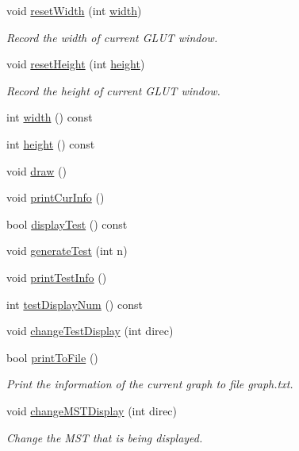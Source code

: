 \begin{DoxyCompactItemize}
void \hyperlink{classcmst_1_1_window_a3f234daf3198e3611892515f1721de44}{resetWidth} (int \hyperlink{classcmst_1_1_window_a5fc4ccbd9afed56cd17d341269028da2}{width})
\begin{DoxyCompactList}\small\item\em Record the width of current GLUT window. \end{DoxyCompactList}\item 
void \hyperlink{classcmst_1_1_window_a8c4d7788d1932e73397c20b7a9639d69}{resetHeight} (int \hyperlink{classcmst_1_1_window_a6fc02b2afee52c0f71b6a3bd39c9210f}{height})
\begin{DoxyCompactList}\small\item\em Record the height of current GLUT window. \end{DoxyCompactList}\item 
int \hyperlink{classcmst_1_1_window_a5fc4ccbd9afed56cd17d341269028da2}{width} () const 
\item 
int \hyperlink{classcmst_1_1_window_a6fc02b2afee52c0f71b6a3bd39c9210f}{height} () const 
\item 
void \hyperlink{classcmst_1_1_window_a1d78ef796691e87ed3b4978f373c9890}{draw} ()
\item 
void \hyperlink{classcmst_1_1_window_a73eb23d7d7418cb288022e623e590461}{printCurInfo} ()
\item 
bool \hyperlink{classcmst_1_1_window_aa3f5edeebdd298190bdb4676b4838f75}{displayTest} () const 
\item 
void \hyperlink{classcmst_1_1_window_acda99115d9c67f83de4d8f5a94f2647c}{generateTest} (int n)
\item 
void \hyperlink{classcmst_1_1_window_a471e1648f99754f7c2cbfbbb1e8ab556}{printTestInfo} ()
\item 
int \hyperlink{classcmst_1_1_window_ae456c1bf45fc28133390fcc881fbd612}{testDisplayNum} () const 
\item 
void \hyperlink{classcmst_1_1_window_aa8dc3725888e12fc2c6e3626ab7b600a}{changeTestDisplay} (int direc)
\item 
bool \hyperlink{classcmst_1_1_window_a1d2514395cd8e864ddcd6aadf127bbbc}{printToFile} ()
\begin{DoxyCompactList}\small\item\em Print the information of the current graph to file graph.txt. \end{DoxyCompactList}\item 
void \hyperlink{classcmst_1_1_window_ae9d9bf19cad20b34a6ab850a8a218c13}{changeMSTDisplay} (int direc)
\begin{DoxyCompactList}\small\item\em Change the MST that is being displayed. \end{DoxyCompactList}\item 

\end{DoxyCompactItemize}
